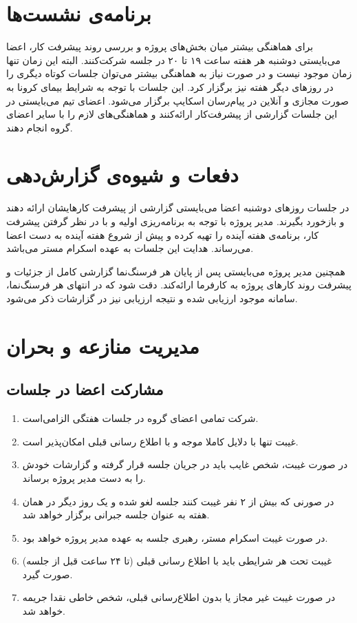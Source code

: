 \section{برنامه‌ی نشست‌ها}
برای هماهنگی بیشتر میان بخش‌های پروژه و بررسی روند پیشرفت کار، اعضا می‌بایستی دوشنبه هر هفته ساعت ۱۹ تا ۲۰ در جلسه شرکت‌کنند. البته این زمان تنها  زمان موجود نیست و در صورت نیاز به هماهنگی بیشتر می‌توان جلسات کوتاه دیگری را در روزهای دیگر هفته نیز برگزار کرد.
این جلسات با توجه به شرایط بیمای کرونا به صورت مجازی و آنلاین در پیام‌رسان اسکایپ برگزار می‌شود.  اعضای تیم می‌بایستی در این جلسات گزارشی از پیشرفت‌کار ارائه‌کنند و هماهنگی‌های لازم را با سایر اعضای گروه انجام دهند.
\section{دفعات و شیوه‌ی گزارش‌دهی}
\label{دفعات و شیوه‌ی گزارش‌دهی}
در جلسات روزهای 
دوشنبه
اعضا می‌بایستی گزارشی از پیشرفت کارهایشان ارائه دهند و بازخورد بگیرند.
مدیر پروژه با توجه به برنامه‌ریزی اولیه و با در نظر گرفتن پیشرفت کار، برنامه‌ی هفته آینده را تهیه کرده و پیش از شروع هفته آینده به دست اعضا می‌رساند.
هدایت این جلسات به عهده اسکرام مستر می‌باشد.

همچنین مدیر پروژه می‌بایستی پس از پایان هر فرسنگ‌نما
گزارشی کامل از جزئیات و پیشرفت روند کارهای پروژه به کارفرما ارائه‌کند.
دقت شود که در انتهای هر فرسنگ‌نما، سامانه موجود ارزیابی شده و نتیجه ارزیابی نیز در گزارشات ذکر می‌شود.

\section{مدیریت منازعه و بحران}
\subsection{مشارکت اعضا در جلسات}
\begin{enumerate}
	\item
	شرکت تمامی اعضای گروه در جلسات هفتگی الزامی‌است.
	\item 
	غیبت تنها با دلایل کاملا موجه و با اطلاع رسانی قبلی امکان‌پذیر است.
	\item
	در صورت غیبت، شخص غایب باید در جریان جلسه قرار گرفته و گزارشات خودش را به دست مدیر پروژه برساند. 
	\item
	در صورنی که بیش از ۲ نفر غیبت کنند جلسه لغو شده و یک روز دیگر در همان هفته به عنوان جلسه جبرانی برگزار خواهد شد.
	\item
	در صورت غیبت اسکرام مستر، رهبری جلسه به عهده مدیر پروژه خواهد بود.
	\item
غیبت‌ تحت هر شرایطی باید با اطلاع رسانی قبلی (تا ۲۴ ساعت قبل از جلسه) صورت گیرد.

	\item
	در صورت غیبت غیر مجاز یا بدون اطلاع‌رسانی قبلی، شخص خاطی نقدا جریمه خواهد شد.
\end{enumerate}


